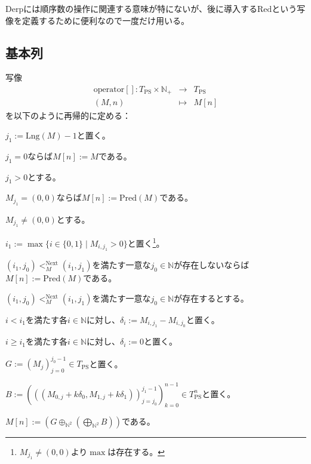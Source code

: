 \documentclass[dvipdfmx,uplatex]{jsarticle}
\theoremstyle{customnonumberbreakfortheorem}
\theoremstyle{customnonumberbreakforproof}
\begin{document}
\(\textrm{Derp}\)には順序数の操作に関連する意味が特にないが、後に導入する\(\textrm{Red}\)という写像を定義するために便利なので一度だけ用いる。


\subsection{基本列}

写像
\begin{eqnarray*}
\textrm{operator}[] \colon T_{\textrm{PS}} \times \mathbb{N}_{+} & \to & T_{\textrm{PS}} \\
(M,n) & \mapsto & M[n]
\end{eqnarray*}
を以下のように再帰的に定める：
\begin{nenumerate}
	\item \(j_1 := \textrm{Lng}(M)-1\)と置く。
	\item \(j_1 = 0\)ならば\(M[n] := M\)である。
	\item \(j_1 > 0\)とする。
	\begin{nenumerate}
		\item \(M_{j_1} = (0,0)\)ならば\(M[n] := \textrm{Pred}(M)\)である。
		\item \(M_{j_1} \neq (0,0)\)とする。
		\begin{nenumerate}
			\item \(i_1 := \max \{i \in \{0,1\} \mid M_{i,j_1} > 0\}\)と置く\footnote{\(M_{j_1} \neq (0,0)\)より\(\max\)は存在する。}。
			\item \((i_1,j_0) <_M^{\textrm{Next}} (i_1,j_1)\)を満たす一意な\(j_0 \in \mathbb{N}\)が存在しないならば\(M[n] := \textrm{Pred}(M)\)である。
			\item \((i_1,j_0) <_M^{\textrm{Next}} (i_1,j_1)\)を満たす一意な\(j_0 \in \mathbb{N}\)が存在するとする。
			\begin{nenumerate}
				\item \(i < i_1\)を満たす各\(i \in \mathbb{N}\)に対し、\(\delta_i := M_{i,j_1} - M_{i,j_0}\)と置く。
				\item \(i \geq i_1\)を満たす各\(i \in \mathbb{N}\)に対し、\(\delta_i := 0\)と置く。
				\item \(G := (M_j)_{j=0}^{j_0-1} \in T_{\textrm{PS}}\)と置く。
				\item \(B := (((M_{0,j} + k \delta_0, M_{1,j} + k \delta_1))_{j=j_0}^{j_1-1})_{k=0}^{n-1} \in T_{\textrm{PS}}^n\)と置く。
				\item \(M[n] := \left(G \oplus_{\mathbb{N}^2} \left( \bigoplus_{\mathbb{N}^2} B \right) \right)\)である。
			\end{nenumerate}
		\end{nenumerate}
	\end{nenumerate}
\end{nenumerate}
\end{document}
